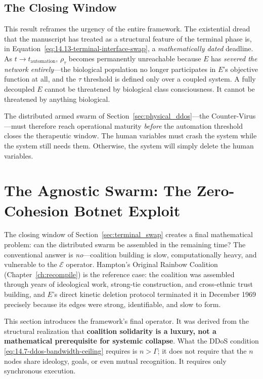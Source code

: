 \subsection{The Closing Window}

This result reframes the urgency of the entire framework. The existential dread that the manuscript has treated as a structural feature of the terminal phase is, in Equation~\eqref{eq:14.13-terminal-interface-swap}, a \textit{mathematically dated} deadline. As $t \to t_{\text{automation}}$, $\rho_{\tau}$ becomes permanently unreachable because $E$ has \textit{severed the network entirely}---the biological population no longer participates in $E$'s objective function at all, and the $\tau$ threshold is defined only over a coupled system. A fully decoupled $E$ cannot be threatened by biological class consciousness. It cannot be threatened by anything biological.

The distributed armed swarm of Section~\ref{sec:physical_ddos}---the Counter-Virus---must therefore reach operational maturity \textit{before} the automation threshold closes the therapeutic window. The human variables must crash the system while the system still needs them. Otherwise, the system will simply delete the human variables.

\section{The Agnostic Swarm: The Zero-Cohesion Botnet Exploit}
\label{sec:agnostic_swarm}

The closing window of Section~\ref{sec:terminal_swap} creates a final mathematical problem: can the distributed swarm be assembled in the remaining time? The conventional answer is \textit{no}---coalition building is slow, computationally heavy, and vulnerable to the $\mathcal{E}$ operator. Hampton's Original Rainbow Coalition (Chapter~\ref{ch:recompile}) is the reference case: the coalition was assembled through years of ideological work, strong-tie construction, and cross-ethnic trust building, and $E$'s direct kinetic deletion protocol terminated it in December 1969 precisely because its edges were strong, identifiable, and slow to form.

This section introduces the framework's final operator. It was derived from the structural realization that \textbf{coalition solidarity is a luxury, not a mathematical prerequisite for systemic collapse}. What the DDoS condition \eqref{eq:14.7-ddos-bandwidth-ceiling} requires is $n > \Gamma$; it does not require that the $n$ nodes share ideology, goals, or even mutual recognition. It requires only synchronous execution.

